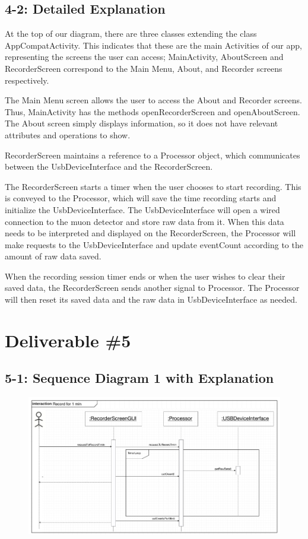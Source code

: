 \documentclass[11pt,a4paper]{article}
\begin{document}
\subsection*{4-2: Detailed Explanation}

At the top of our diagram, there are three classes extending the class AppCompatActivity. This indicates that these are the main Activities of our app, representing the screens the user can access; MainActivity, AboutScreen and RecorderScreen correspond to the Main Menu, About, and Recorder screens respectively.

The Main Menu screen allows the user to access the About and Recorder screens. Thus, MainActivity has the methods openRecorderScreen and openAboutScreen. The About screen simply displays information, so it does not have relevant attributes and operations to show.

RecorderScreen maintains a reference to a Processor object, which communicates between the UsbDeviceInterface and the RecorderScreen.

The RecorderScreen starts a timer when the user chooses to start recording. This is conveyed to the Processor, which will save the time recording starts and initialize the UsbDeviceInterface. The UsbDeviceInterface will open a wired connection to the muon detector and store raw data from it. When this data needs to be interpreted and displayed on the RecorderScreen, the Processor will make requests to the UsbDeviceInterface and update eventCount according to the amount of raw data saved.

When the recording session timer ends or when the user wishes to clear their saved data, the RecorderScreen sends another signal to Processor. The Processor will then reset its saved data and the raw data in UsbDeviceInterface as needed.


\newpage

\section*{Deliverable \#5}

\subsection*{5-1: Sequence Diagram 1 with Explanation}

\begin{figure}[h] \centering
	\includegraphics[width=1.08\textwidth]{sequence1.png}
\end{figure}
\end{document}
